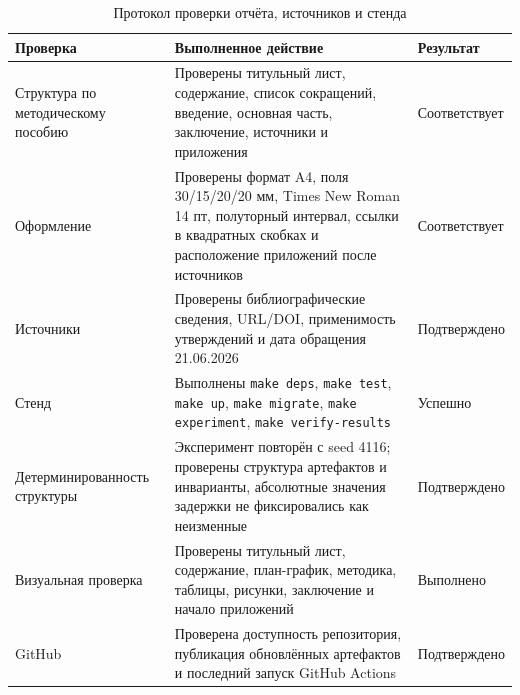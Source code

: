 \documentclass[a4paper,14pt]{extarticle}
\newcommand{\tablefont}{\scriptsize}
\renewcommand{\toprule}{\hline}
\renewcommand{\midrule}{\hline}
\renewcommand{\bottomrule}{\hline}
\numberwithin{figure}{section}
\numberwithin{table}{section}
\begin{document}
\begin{table}[H]
\centering
\caption*{Протокол проверки отчёта, источников и стенда}
\tablefont
\setlength{\tabcolsep}{3pt}
\renewcommand{\arraystretch}{1.15}
\begin{tabular}{|L{4.0cm}|L{7.4cm}|L{3.3cm}|}
\toprule
Проверка & Выполненное действие & Результат \\
\midrule
Структура по методическому пособию & Проверены титульный лист, содержание, список сокращений, введение, основная часть, заключение, источники и приложения & Соответствует \\
\hline
Оформление & Проверены формат A4, поля 30/15/20/20 мм, Times New Roman 14 пт, полуторный интервал, ссылки в квадратных скобках и расположение приложений после источников & Соответствует \\
\hline
Источники & Проверены библиографические сведения, URL/DOI, применимость утверждений и дата обращения 21.06.2026 & Подтверждено \\
\hline
Стенд & Выполнены \texttt{make deps}, \texttt{make test}, \texttt{make up}, \texttt{make migrate}, \texttt{make experiment}, \texttt{make verify-results} & Успешно \\
\hline
Детерминированность структуры & Эксперимент повторён с seed 4116; проверены структура артефактов и инварианты, абсолютные значения задержки не фиксировались как неизменные & Подтверждено \\
\hline
Визуальная проверка & Проверены титульный лист, содержание, план-график, методика, таблицы, рисунки, заключение и начало приложений & Выполнено \\
\hline
GitHub & Проверена доступность репозитория, публикация обновлённых артефактов и последний запуск GitHub Actions & Подтверждено \\
\bottomrule
\end{tabular}
\end{table}
\end{document}
